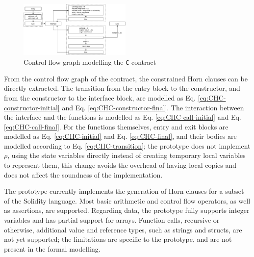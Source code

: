 \begin{figure}[h]
	\centering
	\includegraphics[width=0.49\textwidth]{images/contract-c}
	\caption{Control flow graph modelling the \texttt{C} contract}
	\label{fig:cfg_contract-c}
\end{figure}

From the control flow graph of the contract, the constrained  Horn clauses can be directly extracted. The transition from the entry block to the constructor, and from the constructor to the interface block, are modelled as Eq. \ref{eq:CHC-constructor-initial} and Eq. \ref{eq:CHC-constructor-final}. The interaction between the interface and the functions is modelled as Eq. \ref{eq:CHC-call-initial} and Eq. \ref{eq:CHC-call-final}. For the functions themselves, entry and exit blocks are modelled as Eq. \ref{eq:CHC-initial} and Eq. \ref{eq:CHC-final}, and their bodies are modelled according to Eq. \ref{eq:CHC-transition}; the prototype does not implement $\rho$, using the state variables directly instead of creating temporary local variables to represent them, this change avoids the overhead of having local copies and does not affect the soundness of the implementation.

The prototype currently implements the generation of Horn clauses for a subset of the Solidity language. Most basic arithmetic and control flow operators, as well as assertions, are supported. Regarding data, the prototype fully supports integer variables and has partial support for arrays. Function calls, recursive or otherwise, additional value and reference types, such as strings and structs, are not yet supported; the limitations are specific to the prototype, and are not present in the formal modelling.



